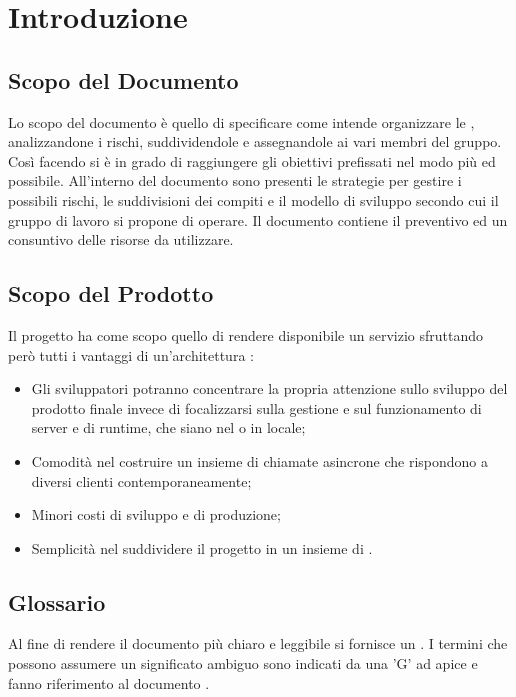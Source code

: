 \section{Introduzione}
\label{introduzione}
\subsection{Scopo del Documento}
Lo scopo del documento è quello di specificare come {\Gruppo} intende organizzare le , analizzandone i rischi, suddividendole e assegnandole ai vari membri del gruppo. Così facendo si è in grado di raggiungere gli obiettivi prefissati nel modo più  ed  possibile. All'interno del documento sono presenti le strategie per gestire i possibili rischi, le suddivisioni dei compiti e il modello di sviluppo secondo cui il gruppo di lavoro si propone di operare. Il documento contiene il preventivo ed un consuntivo delle risorse da utilizzare.

\subsection{Scopo del Prodotto}
Il progetto {\NomeProgetto} ha come scopo quello di rendere disponibile un servizio  sfruttando però tutti i vantaggi di un'architettura :
\begin{itemize}
    \item Gli sviluppatori potranno concentrare la propria attenzione sullo sviluppo del prodotto finale invece di focalizzarsi sulla gestione e sul funzionamento di server e di runtime, che siano nel  o in locale;
    \item Comodità nel costruire un insieme di chiamate asincrone che rispondono a diversi clienti contemporaneamente;
    \item Minori costi di sviluppo e di produzione;
    \item Semplicità nel suddividere il progetto in un insieme di .
\end{itemize}

\subsection{Glossario}
Al fine di rendere il documento più chiaro e leggibile si fornisce un \Glossario{}. I termini che possono assumere un significato ambiguo sono indicati da una 'G' ad apice e fanno riferimento al documento .

